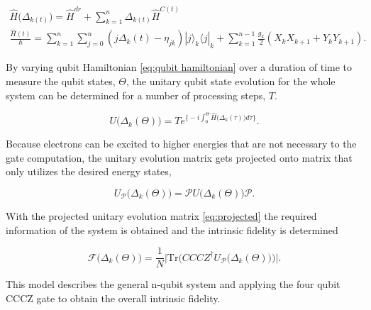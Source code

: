 \begin{gather}
    \label{eq:qubit hamiltonian}
    \hat{H} \big( \Delta_{k(t)} \big) = \hat{H}^{dr} + \sum^{n}_{k=1} \Delta_{k(t)} \hat{H}^{C(t)} \\
    \frac{\hat{H}(t)}{h} = \sum^n_{k=1} \sum^n_{j=0} (j\Delta_k(t)-\eta_{jk}) |j \big\rangle_k \big\langle j |_k + \sum^{n-1}_{k=1} \frac{g_k}{2} (X_kX_{k+1}+Y_kY_{k+1}).
\end{gather}

By varying qubit Hamiltonian \eqref{eq:qubit hamiltonian} over a duration of time to measure the qubit states, $\Theta$, the unitary qubit state evolution for the whole system can be determined for a number of processing steps, $T$. 

\begin{equation}
  \label{eq:evolution operator}
    U\big( \Delta_k(\Theta) \big) = T e^{\Big\{ -i \int_{0}^{\Theta} \hat{H}\big( \Delta_k(\tau) \big) d\tau \Big\} }. 
\end{equation}

Because electrons can be excited to higher energies that are not necessary to the gate computation, the unitary evolution matrix gets projected onto matrix that only utilizes the desired energy states,  

\begin{equation}
    \label{eq:projected}
    U_{\mathscr{P}} \big(\Delta_k (\Theta) \big) =  \mathscr{P} U \big(\Delta_k(\Theta) \big) \mathscr{P}.
\end{equation}

With the projected unitary evolution matrix \eqref{eq:projected} the required information of the system is obtained and the intrinsic fidelity is determined

\begin{equation}
    \mathscr{F}\big(\Delta_k(\Theta)\big)=\frac{1}{N}\Bigg| \mathrm{Tr}\bigg( CCCZ^{\dagger} U_\mathscr{P}\big(\Delta_k(\Theta) \big) \bigg) \Bigg|.
\end{equation}


This model describes the general n-qubit system and applying the four qubit CCCZ gate to obtain the overall intrinsic fidelity.

